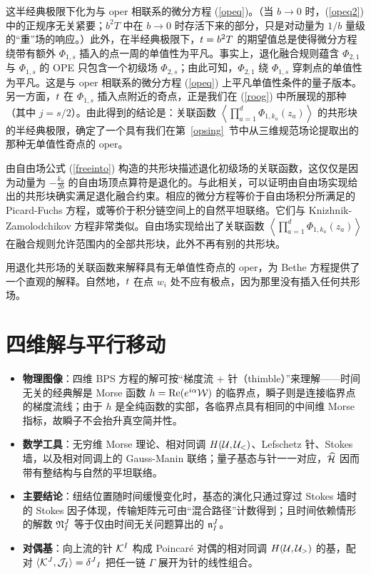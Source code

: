 这半经典极限下化为与 oper 相联系的微分方程 (\ref{opeq})。（当 $b\to 0$ 时，(\ref{opeq2}) 中的正规序无关紧要；$b^2T$ 中在 $b\to 0$ 时存活下来的部分，只是对动量为 $1/b$ 量级的“重”场的响应。）此外，在半经典极限下，$\bt=b^2T$ 的期望值总是使得微分方程绕带有额外 $\Phi_{1,s}$ 插入的点一周的单值性为平凡。事实上，退化融合规则蕴含 $\Phi_{2,1}$ 与 $\Phi_{1,s}$ 的 OPE 只包含一个初级场 $\Phi_{2,s}$；由此可知，$\Phi_{2,1}$ 绕 $\Phi_{1,s}$ 穿刺点的单值性为平凡。这是与 oper 相联系的微分方程 (\ref{opeq}) 上平凡单值性条件的量子版本。另一方面，$\bt$ 在 $\Phi_{1,s}$ 插入点附近的奇点，正是我们在 (\ref{roog}) 中所展现的那种（其中 $j=s/2$）。由此得到的结论是：关联函数 $\left\langle \prod_{a=1}^d\Phi_{1,k_a}(z_a)\right\rangle$ 的共形块的半经典极限，确定了一个具有我们在第~\ref{opsing}~节中从三维规范场论提取出的那种无单值性奇点的 oper。

由自由场公式 (\ref{freeinto}) 构造的共形块描述退化初级场的关联函数，这仅仅是因为动量为 $-\frac{k_a}{2b}$ 的自由场顶点算符是退化的。与此相关，可以证明由自由场实现给出的共形块确实满足退化融合约束。相应的微分方程等价于自由场积分所满足的 Picard-Fuchs 方程，或等价于积分链空间上的自然平坦联络。它们与 Knizhnik-Zamolodchikov 方程非常类似。自由场实现给出了关联函数 $\left\langle \prod_{a=1}^d\Phi_{1,k_a}(z_a)\right\rangle$ 在融合规则允许范围内的全部共形块，此外不再有别的共形块。

用退化共形场的关联函数来解释具有无单值性奇点的 oper，为 Bethe 方程提供了一个直观的解释。自然地，$\bt$ 在点 $w_i$ 处不应有极点，因为那里没有插入任何共形场。


\section{四维解与平行移动}\label{fourd}
\begin{keytakeaways}
\begin{itemize}\setlength{\itemsep}{2pt}
  \item \textbf{物理图像}：四维 BPS 方程的解可按“梯度流 + 针（thimble）”来理解——时间无关的经典解是 Morse 函数 $h=\mathrm{Re}(e^{i\alpha}\W)$ 的临界点，瞬子则是连接临界点的梯度流线；由于 $h$ 是全纯函数的实部，各临界点具有相同的中间维 Morse 指标，故瞬子不会抬升真空简并性。
  \item \textbf{数学工具}：无穷维 Morse 理论、相对同调 $H(\U,\U_<)$、Lefschetz 针、Stokes 墙，以及相对同调上的 Gauss-Manin 联络；量子基态与针一一对应，$\hat\H$ 因而带有整结构与自然的平坦联络。
  \item \textbf{主要结论}：纽结位置随时间缓慢变化时，基态的演化只通过穿过 Stokes 墙时的 Stokes 因子体现，传输矩阵元可由“混合路径”计数得到；且时间依赖情形的解数 $\frak N^J_I$ 等于仅由时间无关问题算出的 $\frak n^J_I$。
  \item \textbf{对偶基}：向上流的针 $\K^I$ 构成 Poincaré 对偶的相对同调 $H(\U,\U_>)$ 的基，配对 $\langle\K^J,\J_I\rangle=\delta^J{}_I$ 把任一链 $\Gamma$ 展开为针的线性组合。
\end{itemize}
\end{keytakeaways}
